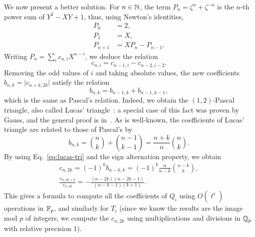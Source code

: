 \documentclass{sig-alternate}
\begin{document}
We now present a better solution. For $n \in \mathbb{N}$, the term
$P_{n}=\zeta^{n} + \zeta^{-n}$ is the $n$-th power sum of $Y^2-XY+1$,
thus, using Newton's identities,
\begin{equation}
  \label{eq:simple}
  \begin{aligned}
    P_0 &= 2,\\
    P_1 &= X,\\
    P_{n+1} &= X P_{n} - P_{n-1}.
  \end{aligned}
\end{equation}
Writing $P_n = \sum_i c_{n,i}X^{n-i}$, we deduce the relation
\begin{equation}
  c_{n,i} = c_{n-1,i} - c_{n-2,i-2}.
\end{equation}
Removing the odd values of $i$ and taking absolute values, the new
coefficients $b_{n,k}=\lvert c_{n+k,2k}\rvert$ satisfy the relation
\begin{equation*}
  b_{n,k} = b_{n-1,k} + b_{n-1,k-1},
\end{equation*}
which is the same as Pascal's relation. Indeed, we obtain the
$(1,2)$-Pascal triangle, also called Lucas'
triangle~\cite{benjamin10}:
a special case of this fact was proven by Gauss, and the general proof
is in~\cite[Prop.~1]{gurak06}. As is well-known, the coefficients of
Lucas' triangle are related to those of Pascal's by
\begin{equation}
  \label{eq:lucas-tri}
  b_{n,k} = \binom{n}{k} + \binom{n-1}{k-1} = \frac{n+k}{n}\binom{n}{k}.
\end{equation}
By using Eq.~\eqref{eq:lucas-tri} and the sign alternation property,
we obtain 
\begin{gather}
  c_{n,2k} = (-1)^kb_{n-k,k} = (-1)^k\frac{n}{n-k}\binom{n-k}{k},\\
  \label{eq:lucas-recurrence}
  \frac{c_{n,2k+2}}{c_{n,2k}} = 
  -\frac{(n-2k)(n-2k-1)}{(n-k-1)(k+1)}.
\end{gather}
This gives a formula to compute all the coefficients of $Q_{i}$ using
$O(\ell^{i})$ operations in $\mathbb{F}_p$, and similarly for $T_i$ (since we know
the results are the image mod $p$ of integers, we compute 
the $c_{n,2k}$ using multiplications and divisions in $\mathbb{Q}_p$ with
relative precision 1).
\end{document}
